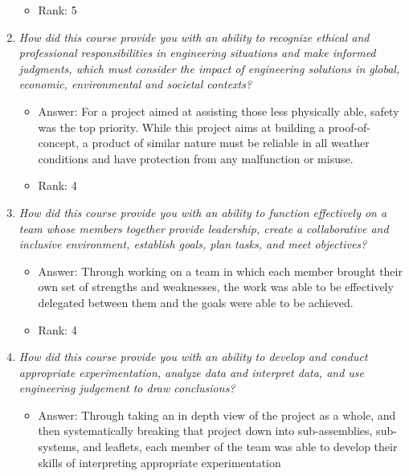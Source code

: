 \documentclass[conference]{IEEEtran}
\begin{document}
\begin{enumerate}
\begin{itemize}
        \item Rank: 5
        \vspace{.3cm}
    \end{itemize}
    \item \textit{How did this course provide you with an ability to recognize ethical and professional responsibilities in engineering situations and make informed judgments, which must consider the impact of engineering solutions in global, economic, environmental and societal contexts?}
    \begin{itemize}
        \vspace{.3cm}
        \item Answer: For a project aimed at assisting those less physically able, safety was the top priority. While this project aims at building a proof-of-concept, a product of similar nature must be reliable in all weather conditions and have protection from any malfunction or misuse.
        \item Rank: 4
        \vspace{.3cm}
    \end{itemize}
    \item \textit{ How did this course provide you with an ability to function effectively on a team whose members together provide leadership, create a collaborative and inclusive environment, establish goals, plan tasks, and meet objectives?}
    \begin{itemize}
        \vspace{.3cm}
        \item Answer: Through working on a team in which each member brought their own set of strengths and weaknesses, the work was able to be effectively delegated between them and the goals were able to be achieved.
        \item Rank: 4
        \vspace{.3cm}
    \end{itemize}
    \item \textit{ How did this course provide you with an ability to develop and conduct appropriate experimentation, analyze data and interpret data, and use engineering judgement to draw conclusions?}
    \begin{itemize}
        \vspace{.3cm}
        \item Answer: Through taking an in depth view of the project as a whole, and then systematically breaking that project down into sub-assemblies, sub-systems, and leaflets, each member of the team was able to develop their skills of interpreting appropriate experimentation

\end{itemize}
\end{enumerate}
\end{document}
